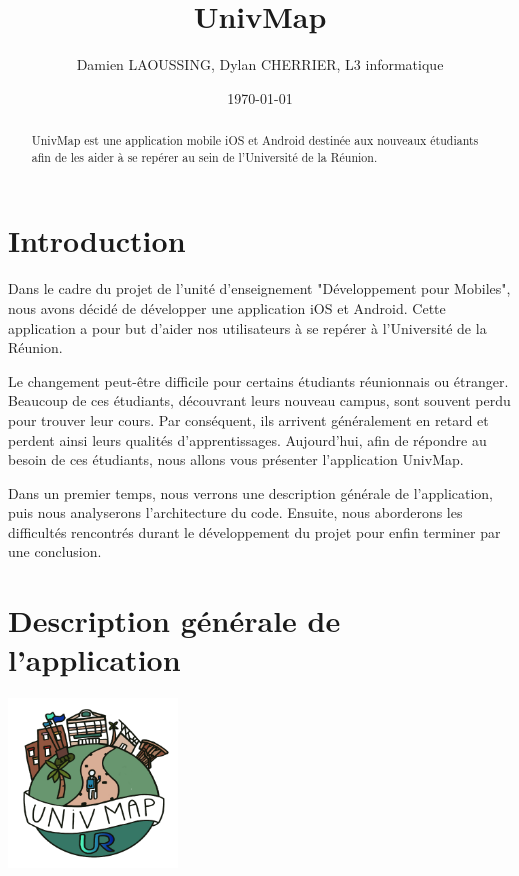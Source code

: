 \documentclass{article}
\title{UnivMap}
\author{Damien LAOUSSING, Dylan CHERRIER, L3 informatique}
\date{\today}
\begin{document}
\maketitle %


\begin{abstract}
  UnivMap est une application mobile iOS et Android destinée aux nouveaux
  étudiants afin de les aider à se repérer au sein de l'Université de la Réunion.
\end{abstract}


\section{Introduction}
\label{section:intro} %

Dans le cadre du projet de l'unité d'enseignement "Développement pour Mobiles", nous avons décidé de développer
une application iOS et Android. Cette application a pour but d'aider nos utilisateurs à se repérer à l'Université de la Réunion.

Le changement peut-être difficile pour certains étudiants réunionnais ou étranger.
Beaucoup de ces étudiants, découvrant leurs nouveau campus, sont souvent perdu pour trouver leur cours. Par conséquent,
ils arrivent généralement en retard et perdent ainsi leurs qualités d'apprentissages.
Aujourd'hui, afin de répondre au besoin de ces étudiants, nous allons vous présenter l'application UnivMap.

Dans un premier temps, nous verrons une description générale de l'application, puis nous analyserons
l'architecture du code. Ensuite, nous aborderons les difficultés rencontrés durant le développement
du projet pour enfin terminer par une conclusion.

\section{Description générale de l'application}


\begin{center}
    \includegraphics[width=45mm, scale=0.5]{UnivMap-logo500x500.png}
\end{center}
\end{document}
